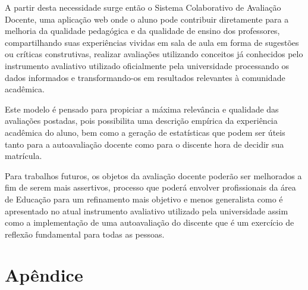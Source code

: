\documentclass[12pt, a4paper]{report}
\begin{document}
A partir desta necessidade surge então o Sistema Colaborativo de Avaliação Docente, uma aplicação web onde o aluno pode contribuir diretamente para a melhoria  da qualidade pedagógica e da qualidade de ensino dos professores, compartilhando suas experiências vividas em sala de aula em forma de sugestões ou críticas construtivas, realizar avaliações utilizando conceitos já conhecidos pelo instrumento avaliativo utilizado oficialmente pela universidade processando os dados informados e transformando-os em resultados relevantes à comunidade acadêmica.

Este modelo é pensado para propiciar a máxima relevância e qualidade das avaliações postadas, pois possibilita uma descrição empírica da experiência acadêmica do aluno, bem como a geração de estatísticas que podem ser úteis tanto para a autoavaliação docente como para o discente  hora de decidir sua matrícula.

Para trabalhos futuros, os objetos da avaliação docente poderão ser melhorados a fim de serem mais assertivos, processo que poderá envolver profissionais da área de Educação para um refinamento mais objetivo e menos generalista como é apresentado no atual instrumento avaliativo utilizado pela universidade assim como a implementação de uma autoavaliação do discente que é um exercício de reflexão fundamental para todas as pessoas. 

\renewcommand\bibname{Referências}

%
%

\nocite{*}

\appendix
\chapter{Apêndice}
\label{ape:apendice}




\end{document}
